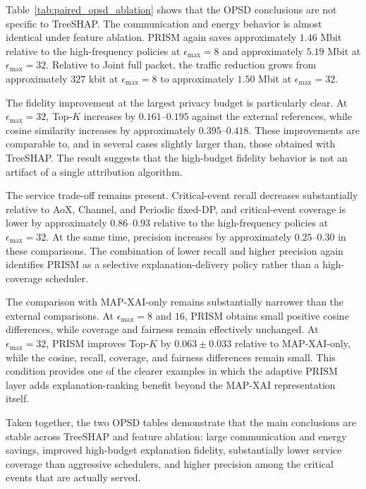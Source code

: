 \documentclass[11pt]{article}
\begin{document}
Table~\ref{tab:paired_opsd_ablation} shows that the OPSD conclusions are not specific to TreeSHAP. The communication and energy behavior is almost identical under feature ablation. PRISM again saves approximately $1.46$ Mbit relative to the high-frequency policies at $\epsilon_{\max}=8$ and approximately $5.19$ Mbit at $\epsilon_{\max}=32$. Relative to Joint full packet, the traffic reduction grows from approximately $327$ kbit at $\epsilon_{\max}=8$ to approximately $1.50$ Mbit at $\epsilon_{\max}=32$.

The fidelity improvement at the largest privacy budget is particularly clear. At $\epsilon_{\max}=32$, Top-$K$ increases by $0.161$--$0.195$ against the external references, while cosine similarity increases by approximately $0.395$--$0.418$. These improvements are comparable to, and in several cases slightly larger than, those obtained with TreeSHAP. The result suggests that the high-budget fidelity behavior is not an artifact of a single attribution algorithm.

The service trade-off remains present. Critical-event recall decreases substantially relative to AoX, Channel, and Periodic fixed-DP, and critical-event coverage is lower by approximately $0.86$--$0.93$ relative to the high-frequency policies at $\epsilon_{\max}=32$. At the same time, precision increases by approximately $0.25$--$0.30$ in these comparisons. The combination of lower recall and higher precision again identifies PRISM as a selective explanation-delivery policy rather than a high-coverage scheduler.

The comparison with MAP-XAI-only remains substantially narrower than the external comparisons. At $\epsilon_{\max}=8$ and $16$, PRISM obtains small positive cosine differences, while coverage and fairness remain effectively unchanged. At $\epsilon_{\max}=32$, PRISM improves Top-$K$ by $0.063\pm0.033$ relative to MAP-XAI-only, while the cosine, recall, coverage, and fairness differences remain small. This condition provides one of the clearer examples in which the adaptive PRISM layer adds explanation-ranking benefit beyond the MAP-XAI representation itself.

Taken together, the two OPSD tables demonstrate that the main conclusions are stable across TreeSHAP and feature ablation: large communication and energy savings, improved high-budget explanation fidelity, substantially lower service coverage than aggressive schedulers, and higher precision among the critical events that are actually served.
\end{document}
